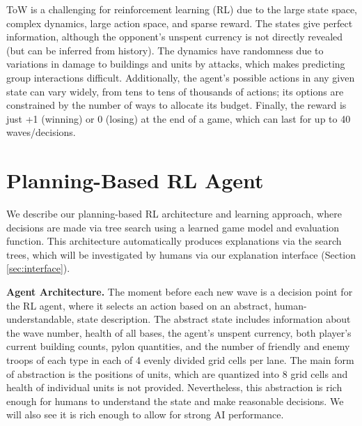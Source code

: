 \documentclass{article}
\begin{document}
ToW is a challenging for reinforcement learning (RL) due to the large state space, complex dynamics, large action space, and sparse reward. The states give perfect information, although the opponent's unspent currency is not directly revealed (but can be inferred from history). The dynamics have randomness due to variations in damage to buildings and units by attacks, which makes predicting group interactions difficult.
Additionally, the agent's possible actions in any given state can vary widely, from tens to tens of thousands of actions; its options are constrained by the number of ways to allocate its budget.
Finally, the reward is just +1 (winning) or 0 (losing) at the end of a game, which can last for up to 40 waves/decisions. 

\section{Planning-Based RL Agent}
\label{learned-components}

We describe our planning-based RL architecture and learning approach, where decisions are made via tree search using a learned game model and evaluation function. This architecture automatically produces explanations via the search trees, which will be investigated by humans via our explanation interface (Section \ref{sec:interface}). 

{\bf Agent Architecture.} The moment before each new wave is a decision point for the RL agent, where it selects an action based on an abstract, human-understandable, state description. The abstract state includes information about the wave number, health of all bases, the agent's unspent currency, both player's current building counts, pylon quantities, and the number of friendly and enemy troops of each type in each of 4 evenly divided grid cells per lane. The main form of abstraction is the positions of units, which are quantized into 8 grid cells and health of individual units is not provided. Nevertheless, this abstraction is rich enough for humans to understand the state and make reasonable decisions. We will also see it is rich enough to allow for strong AI performance. 

\end{document}
